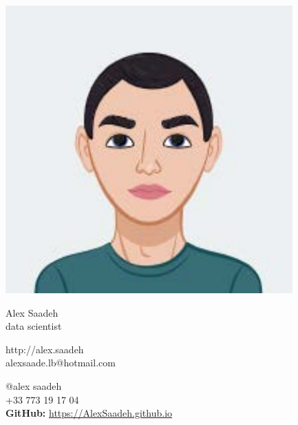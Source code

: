 \documentclass{article}
\begin{document}
\centering \includegraphics[width=.25\linewidth]{logo}\\[5pt]
\parbox{2in}{\Large \centering Alex Saadeh\\[1pt]
\normalsize data scientist}

\vfill
\raggedright
\begin{multicols}{2}
http://alex.saadeh\\
alexsaade.lb@hotmail.com

\columnbreak
\raggedleft
@alex saadeh\\
+33 773 19 17 04\\
\textbf{GitHub:} \href{https://AlexSaadeh.github.io}{https://AlexSaadeh.github.io}

\end{multicols}%
\end{document}
